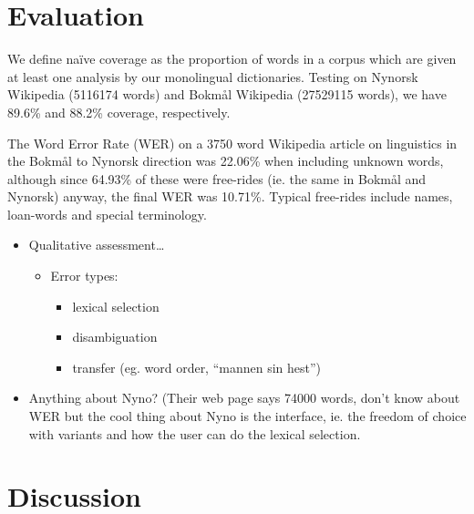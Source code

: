 \documentclass[11pt]{article}
\begin{document}
\section{Evaluation}
\label{sec-4}

  \label{SEC:eval}
We define naïve coverage as the proportion of words in a corpus which
are given at least one analysis by our monolingual
dictionaries. Testing on Nynorsk Wikipedia (5116174 words) and Bokmål
Wikipedia (27529115 words), we have 89.6\% and 88.2\% coverage,
respectively.

The Word Error Rate (WER) on a 3750 word Wikipedia article on
linguistics in the Bokmål to Nynorsk direction was 22.06\% when
including unknown words, although since 64.93\% of these were
free-rides (ie. the same in Bokmål and Nynorsk) anyway, the final WER
was 10.71\%. Typical free-rides include names, loan-words and special
terminology.

\begin{itemize}
\item Qualitative assessment\ldots{}

\begin{itemize}
\item Error types:

\begin{itemize}
\item lexical selection
\item disambiguation
\item transfer (eg. word order, ``mannen sin hest'')
\end{itemize}

\end{itemize}

\item Anything about Nyno? (Their web page says 74000 words, don't know
  about WER but the cool thing about Nyno is the interface, ie. the
  freedom of choice with variants and how the user can do the lexical
  selection.
\end{itemize}
\section{Discussion}
\label{sec-5}
\end{document}
